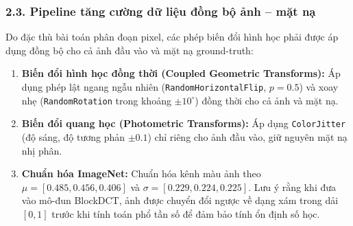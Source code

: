 \subsubsection{2.3. Pipeline tăng cường dữ liệu đồng bộ ảnh -- mặt nạ}
\indent\indent Do đặc thù bài toán phân đoạn pixel, các phép biến đổi hình học phải được áp dụng đồng bộ cho cả ảnh đầu vào và mặt nạ ground-truth:
\begin{enumerate}
    \item \textbf{Biến đổi hình học đồng thời (Coupled Geometric Transforms):} Áp dụng phép lật ngang ngẫu nhiên (\texttt{RandomHorizontalFlip}, $p=0.5$) và xoay nhẹ (\texttt{RandomRotation} trong khoảng $\pm 10^\circ$) đồng thời cho cả ảnh và mặt nạ.
    \item \textbf{Biến đổi quang học (Photometric Transforms):} Áp dụng \texttt{ColorJitter} (độ sáng, độ tương phản $\pm 0.1$) chỉ riêng cho ảnh đầu vào, giữ nguyên mặt nạ nhị phân.
    \item \textbf{Chuẩn hóa ImageNet:} Chuẩn hóa kênh màu ảnh theo $\mu = [0.485, 0.456, 0.406]$ và $\sigma = [0.229, 0.224, 0.225]$. Lưu ý rằng khi đưa vào mô-đun BlockDCT, ảnh được chuyển đổi ngược về dạng xám trong dải $[0, 1]$ trước khi tính toán phổ tần số để đảm bảo tính ổn định số học.
\end{enumerate}
